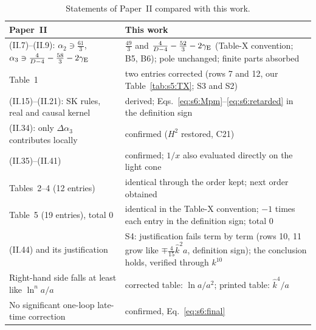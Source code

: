 \documentclass[aps,prd,onecolumn,10pt,nofootinbib,floatfix]{revtex4-2}
\newcommand{\PII}{Paper~II}
\newcommand{\eqII}[1]{(II.#1)}
\newcommand{\khat}{\hat k}
\begin{document}
\begin{table}[htbp]
\caption{Statements of \PII{} compared with this work.}
\label{tab:s6:comp}
\renewcommand{\arraystretch}{1.25}
\begin{ruledtabular}
\begin{tabular}{>{\raggedright\arraybackslash}p{} >{\raggedright\arraybackslash}p{}}
\PII & This work\\
\hline
\eqII{7}--\eqII{9}: $\alpha_2\ni\frac{61}3$, $\alpha_3\ni\frac4{D-4}-\frac{58}3-2\gamma_{\rm E}$ &
$\frac{49}3$ and $\frac4{D-4}-\frac{52}3-2\gamma_{\rm E}$ (Table-X convention; B5, B6); pole unchanged; finite parts absorbed\\
Table~1 & two entries corrected (rows 7 and 12, our Table~\ref{tab:s5:TX}; S3 and S2)\\
\eqII{15}--\eqII{21}: SK rules, real and causal kernel & derived; Eqs.~\eqref{eq:s6:Mpm}--\eqref{eq:s6:retarded} in the
definition sign\\
\eqII{34}: only $\Delta\alpha_3$ contributes locally & confirmed ($H^2$ restored, C21)\\
\eqII{35}--\eqII{41} & confirmed; $1/x$ also evaluated directly on the light cone\\
Tables~2--4 (12 entries) & identical through the order kept; next order obtained\\
Table~5 (19 entries), total $0$ & identical in the Table-X convention; $-1$ times each entry in the definition sign;
total $0$\\
\eqII{44} and its justification & S4: justification fails term by term (rows 10, 11 grow like $\mp\frac4{15}\khat^2a$, definition sign);
the conclusion holds, verified through $k^{10}$\\
Right-hand side falls at least like $\ln^na/a$ & corrected table: $\ln a/a^2$; printed table: $\khat^4/a$\\
No significant one-loop late-time correction & confirmed, Eq.~\eqref{eq:s6:final}\\
\end{tabular}
\end{ruledtabular}
\end{table}
\end{document}
